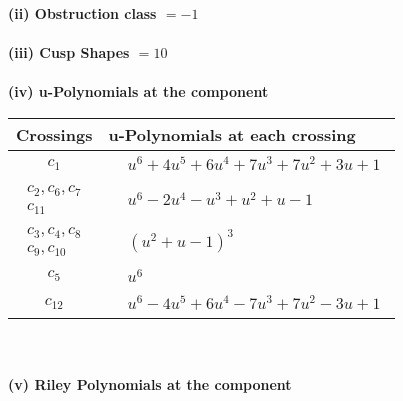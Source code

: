 \documentclass[1p]{elsarticle_modified}
\theoremstyle{definition}
\begin{document}
\flushleft \textbf{(ii) Obstruction class $= -1$}\\~\\
\flushleft \textbf{(iii) Cusp Shapes $= 10$}\\~\\
\newpage\renewcommand{\arraystretch}{1}
\flushleft \textbf{(iv) u-Polynomials at the component}\newline \\
\begin{tabular}{m{50pt}|m{274pt}}
Crossings & \hspace{64pt}u-Polynomials at each crossing \\
\hline $$\begin{aligned}c_{1}\end{aligned}$$&$\begin{aligned}
&u^6+4 u^5+6 u^4+7 u^3+7 u^2+3 u+1
\end{aligned}$\\
\hline $$\begin{aligned}c_{2},c_{6},c_{7}\\c_{11}\end{aligned}$$&$\begin{aligned}
&u^6-2 u^4- u^3+u^2+u-1
\end{aligned}$\\
\hline $$\begin{aligned}c_{3},c_{4},c_{8}\\c_{9},c_{10}\end{aligned}$$&$\begin{aligned}
&(u^2+u-1)^3
\end{aligned}$\\
\hline $$\begin{aligned}c_{5}\end{aligned}$$&$\begin{aligned}
&u^6
\end{aligned}$\\
\hline $$\begin{aligned}c_{12}\end{aligned}$$&$\begin{aligned}
&u^6-4 u^5+6 u^4-7 u^3+7 u^2-3 u+1
\end{aligned}$\\
\hline
\end{tabular}\\~\\
\newpage\renewcommand{\arraystretch}{1}
\flushleft \textbf{(v) Riley Polynomials at the component}\newline \\
\end{document}
